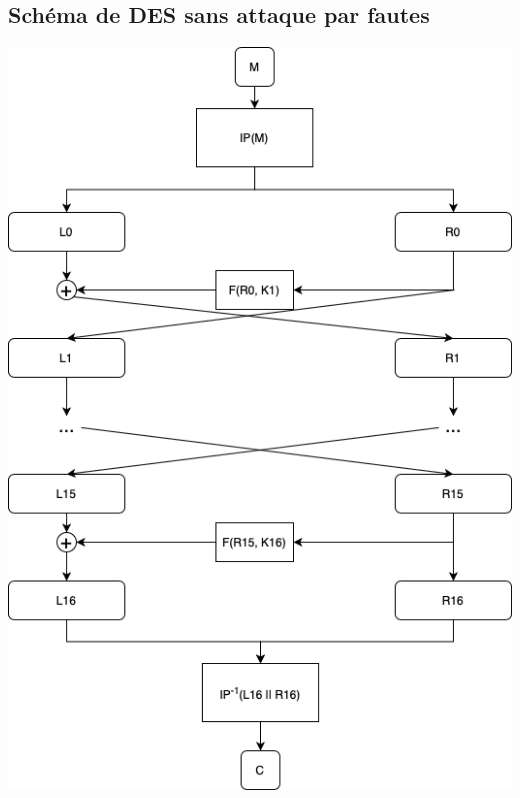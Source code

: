 \documentclass[10pt,a4paper]{article}
\begin{document}
\subsection{Schéma de DES sans attaque par fautes}
\label{schema 1}
 \begin{center}
\includegraphics[scale=0.8]{../schemas/Schema_DES_sans_attaque_faute.png}
 \end{center}

\newpage
\end{document}
